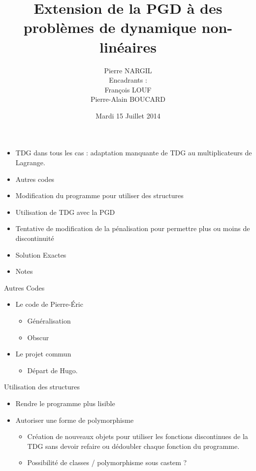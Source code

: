 \documentclass[10pt,a4paper]{beamer}
\title[Présentation Petit Dej]{Extension de la PGD à des problèmes de dynamique non-linéaires}
\author[Pierre NARGIL]{Pierre NARGIL\\Encadrants : 
\large{\\François LOUF\\Pierre-Alain BOUCARD} }
\institute{LMT Cachan}
\date{Mardi 15 Juillet 2014}
\begin{document}
\begin{frame}
	\titlepage
\end{frame}

\begin{frame}
	\begin{itemize}
		\item TDG dans tous les cas : adaptation manquante de TDG au multiplicateurs de Lagrange.
		\item Autres codes
		\item Modification du programme pour utiliser des structures
		\item Utilisation de TDG avec la PGD
		\item Tentative de modification de la pénalisation pour permettre plus ou moins de discontinuité
		\item Solution Exactes
		\item Notes
	\end{itemize}
\end{frame}

\begin{frame}{Autres Codes}
	\begin{itemize}
		\item Le code de Pierre-Éric
			\begin{itemize}
				\item Généralisation
				\item Obscur
			\end{itemize}
		\item Le projet commun
			\begin{itemize}
				\item Départ de Hugo. 
			\end{itemize}
	\end{itemize}
\end{frame}

\begin{frame}{Utilisation des structures}
	\begin{itemize}
		\item Rendre le programme plus lisible
		\item Autoriser une forme de polymorphisme
			\begin{itemize}
				\item Création de nouveaux objets pour utiliser les fonctions discontinues de la TDG
				sans devoir refaire ou dédoubler chaque fonction du programme.
				\item Possibilité de classes / polymorphisme sous castem ?
			\end{itemize}
	\end{itemize}
\end{frame}
\end{document}
